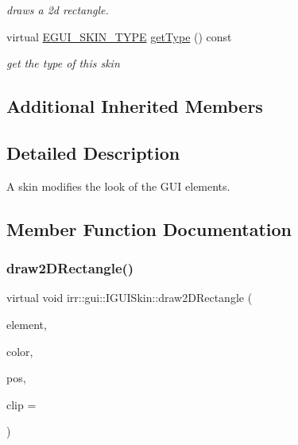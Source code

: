 \begin{DoxyCompactItemize}
\begin{DoxyCompactList}\small\item\em draws a 2d rectangle. \end{DoxyCompactList}\item 
\mbox{\label{classirr_1_1gui_1_1IGUISkin_ad42c8e52f5e60d27d065f6546446d9ff}} 
virtual \hyperlink{namespaceirr_1_1gui_a7b4619db540cbdf96e81023893b4eca5}{E\+G\+U\+I\+\_\+\+S\+K\+I\+N\+\_\+\+T\+Y\+PE} \hyperlink{classirr_1_1gui_1_1IGUISkin_ad42c8e52f5e60d27d065f6546446d9ff}{get\+Type} () const
\begin{DoxyCompactList}\small\item\em get the type of this skin \end{DoxyCompactList}\end{DoxyCompactItemize}
\subsection*{Additional Inherited Members}


\subsection{Detailed Description}
A skin modifies the look of the G\+UI elements. 

\subsection{Member Function Documentation}
\mbox{\label{classirr_1_1gui_1_1IGUISkin_a137082ed352db8dcb713449dfba0ff3e}} 
\subsubsection{\texorpdfstring{draw2\+D\+Rectangle()}{draw2DRectangle()}}
{\footnotesize\ttfamily virtual void irr\+::gui\+::\+I\+G\+U\+I\+Skin\+::draw2\+D\+Rectangle (\begin{DoxyParamCaption}\item[{\hyperlink{classirr_1_1gui_1_1IGUIElement}{I\+G\+U\+I\+Element} $\ast$}]{element,  }\item[{const \hyperlink{classirr_1_1video_1_1SColor}{video\+::\+S\+Color} \&}]{color,  }\item[{const \hyperlink{classirr_1_1core_1_1rect}{core\+::rect}$<$ \hyperlink{namespaceirr_ac66849b7a6ed16e30ebede579f9b47c6}{s32} $>$ \&}]{pos,  }\item[{const \hyperlink{classirr_1_1core_1_1rect}{core\+::rect}$<$ \hyperlink{namespaceirr_ac66849b7a6ed16e30ebede579f9b47c6}{s32} $>$ $\ast$}]{clip = {} }\end{DoxyParamCaption})\hspace{0.3cm}{\ttfamily [pure virtual]}}



